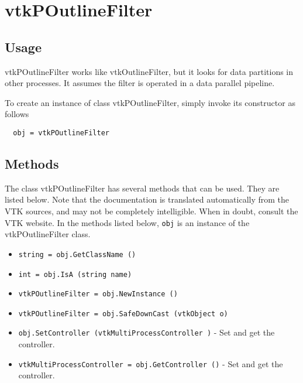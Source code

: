 \section{vtkPOutlineFilter}

\subsection{Usage}

 vtkPOutlineFilter works like vtkOutlineFilter, but it looks for data
 partitions in other processes.  It assumes the filter is operated
 in a data parallel pipeline.

To create an instance of class vtkPOutlineFilter, simply
invoke its constructor as follows
\begin{verbatim}
  obj = vtkPOutlineFilter
\end{verbatim}
\subsection{Methods}

The class vtkPOutlineFilter has several methods that can be used.
  They are listed below.
Note that the documentation is translated automatically from the VTK sources,
and may not be completely intelligible.  When in doubt, consult the VTK website.
In the methods listed below, \verb|obj| is an instance of the vtkPOutlineFilter class.
\begin{itemize}
\item  \verb|string = obj.GetClassName ()|

\item  \verb|int = obj.IsA (string name)|

\item  \verb|vtkPOutlineFilter = obj.NewInstance ()|

\item  \verb|vtkPOutlineFilter = obj.SafeDownCast (vtkObject o)|

\item  \verb|obj.SetController (vtkMultiProcessController )| -  Set and get the controller.

\item  \verb|vtkMultiProcessController = obj.GetController ()| -  Set and get the controller.

\end{itemize}
